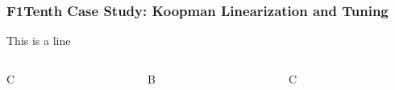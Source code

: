 \documentclass[shortpres,aspectratio=43]{beamer}
\begin{document}
\begin{frame}
\frametitle{F1Tenth Case Study: Koopman Linearization and Tuning}
This is a line
\begin{columns}
	\begin{column}{0.32\linewidth}
		C
	\end{column}
	\begin{column}{0.32\linewidth}
		B
	\end{column}
	\begin{column}{0.32\linewidth}
		C
	\end{column}
\end{columns}

\end{frame}
\end{document}
